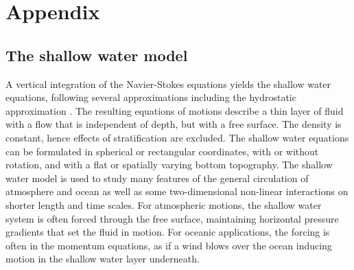 \chapter{Appendix}
\renewcommand{\thechapter}{A}

\section{The shallow water model}
\label{sec:swm_appendix}

A vertical integration of the Navier-Stokes equations yields the shallow water equations, following several approximations
including the hydrostatic approximation \citep{Gill1982,Vallis2006}. The resulting equations of motions describe a thin
layer of fluid with a flow that is independent of depth, but with a free surface. The density is constant, hence effects of
stratification are excluded. The shallow water equations can be formulated in spherical or rectangular coordinates, with
or without rotation, and with a flat or spatially varying bottom topography. The shallow water model is used to study many
features of the general circulation of atmosphere and ocean as well as some two-dimensional non-linear interactions on
shorter length and time scales. For atmospheric motions, the shallow water system is often forced through the free surface,
maintaining horizontal pressure gradients that set the fluid in motion. For oceanic applications, the forcing is often in
the momentum equations, as if a wind blows over the ocean inducing motion in the shallow water layer underneath.


